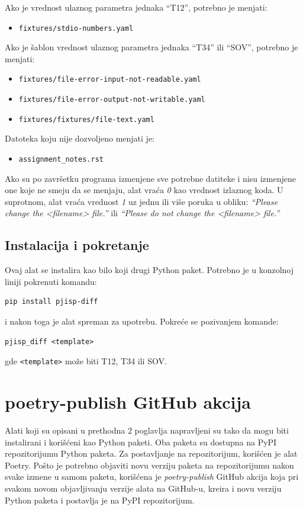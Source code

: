 \documentclass[12pt]{report}
\begin{document}
Ako je vrednost ulaznog parametra jednaka ``T12'', potrebno je menjati:

\begin{itemize}
    \item \texttt{fixtures/stdio-numbers.yaml}
\end{itemize}

Ako je šablon vrednost ulaznog parametra jednaka ``T34'' ili ``SOV'', potrebno je menjati:

\begin{itemize}
    \item \texttt{fixtures/file-error-input-not-readable.yaml}
    \item \texttt{fixtures/file-error-output-not-writable.yaml}
    \item \texttt{fixtures/fixtures/file-text.yaml}
\end{itemize}

Datoteka koju nije dozvoljeno menjati je:

\begin{itemize}
    \item \texttt{assignment\_notes.rst}
\end{itemize}

Ako su po završetku programa izmenjene sve potrebne datiteke i nisu izmenjene one koje ne smeju da se menjaju, alat vraća \textit{0} kao vrednost izlaznog koda. U suprotnom, alat vraća vrednost \textit{1} uz jednu ili više poruka u obliku: \textit{``Please change the <filename> file.''} ili \textit{``Please do not change the <filename> file.''}

\subsection{Instalacija i pokretanje}
Ovaj alat se instalira kao bilo koji drugi Python paket. Potrebno je u konzolnoj liniji pokrenuti komandu:

\begin{verbatim}
pip install pjisp-diff
\end{verbatim}

i nakon toga je alat spreman za upotrebu. Pokreće se pozivanjem komande:

\begin{verbatim}
pjisp_diff <template>
\end{verbatim}

gde \texttt{<template>} može biti T12, T34 ili SOV.

\section{poetry-publish GitHub akcija}
Alati koji su opisani u prethodna 2 poglavlja napravljeni su tako da mogu biti instalirani i korišćeni kao Python paketi. Oba paketa su dostupna na PyPI repozitorijumu Python paketa. Za postavljanje na repozitorijum, korišćen je alat Poetry. Pošto je potrebno objaviti novu verziju paketa na repozitorijumu nakon svake izmene u samom paketu, korišćena je \textit{poetry-publish} \cite{poetry-publish-repo} GitHub akcija koja pri svakom novom objavljivanju verzije alata na GitHub-u, kreira i novu verziju Python paketa i postavlja je na PyPI repozitorijum.
\end{document}
